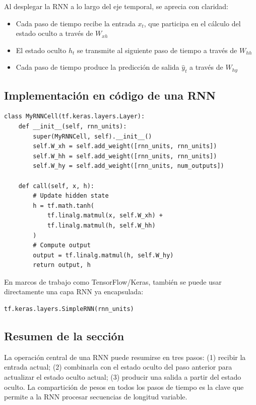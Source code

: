 Al desplegar la RNN a lo largo del eje temporal, se aprecia con claridad:
\begin{itemize}
    \item Cada paso de tiempo recibe la entrada $x_t$, que participa en el cálculo del estado oculto a través de $W_{xh}$
    \item El estado oculto $h_t$ se transmite al siguiente paso de tiempo a través de $W_{hh}$
    \item Cada paso de tiempo produce la predicción de salida $\hat{y}_t$ a través de $W_{hy}$
\end{itemize}

\subsection{Implementación en código de una RNN}

\begin{lstlisting}[caption={Implementación de una capa RNN con TensorFlow}]
class MyRNNCell(tf.keras.layers.Layer):
    def __init__(self, rnn_units):
        super(MyRNNCell, self).__init__()
        self.W_xh = self.add_weight([rnn_units, rnn_units])
        self.W_hh = self.add_weight([rnn_units, rnn_units])
        self.W_hy = self.add_weight([rnn_units, num_outputs])

    def call(self, x, h):
        # Update hidden state
        h = tf.math.tanh(
            tf.linalg.matmul(x, self.W_xh) +
            tf.linalg.matmul(h, self.W_hh)
        )
        # Compute output
        output = tf.linalg.matmul(h, self.W_hy)
        return output, h
\end{lstlisting}

En marcos de trabajo como TensorFlow/Keras, también se puede usar directamente una capa RNN ya encapsulada:

\begin{lstlisting}[caption={Uso de la capa SimpleRNN encapsulada de Keras}]
tf.keras.layers.SimpleRNN(rnn_units)
\end{lstlisting}

\subsection{Resumen de la sección}

La operación central de una RNN puede resumirse en tres pasos: (1) recibir la entrada actual; (2) combinarla con el estado oculto del paso anterior para actualizar el estado oculto actual; (3) producir una salida a partir del estado oculto. La compartición de pesos en todos los pasos de tiempo es la clave que permite a la RNN procesar secuencias de longitud variable.

\newpage
